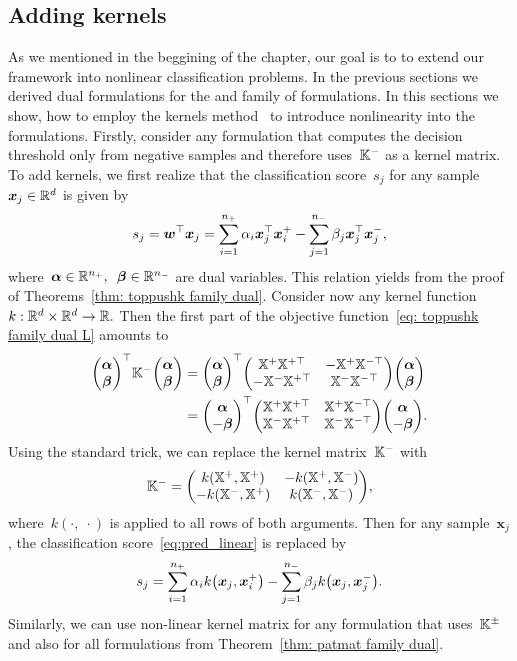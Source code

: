 \subsection{Adding kernels}

As we mentioned in the beggining of the chapter, our goal is to to extend our framework into nonlinear classification problems. In the previous sections we derived dual formulations for the \TopPushK and \PatMat family of formulations. In this sections we show, how to employ the kernels method~\cite{scholkopf2001learning} to introduce nonlinearity into the formulations. Firstly, consider any formulation that computes the decision threshold only from negative samples and therefore uses~$\mathbb{K}^{-}$ as a kernel matrix. To add kernels, we first realize that the classification score~$s_j$ for any sample~$\bm{x}_j \in \mathbb{R}^d$ is given by 
\begin{equation}\label{eq:pred_linear}
  s_j
    = \bm{w}^{\top} \bm{x}_j
    = \sum_{i = 1}^{n_{+}} \alpha_i \bm{x}_j^{\top} \bm{x}_i^+ - \sum_{j = 1}^{n_{-}} \beta_j \bm{x}_j^{\top} \bm{x}_j^-,
\end{equation}
where~$\bm{\alpha} \in \mathbb{R}^{n_{+}},$~$\bm{\beta} \in \mathbb{R}^{n_{-}}$ are dual variables. This relation yields from the proof of Theorems~\ref{thm: toppushk family dual}. Consider now any kernel function~$k: \mathbb{R}^d \times \mathbb{R}^d \to \mathbb{R}.$ Then the first part of the objective function~\eqref{eq: toppushk family dual L} amounts to
\begin{align*}
  \vecab^\top \Kneg \vecab
  & = \vecab^\top \Matrix{\X^+ \X^{+\top} & -\X^+ \X^{-\top} \\ -\X^- \X^{+\top} & \X^- \X^{-\top} } \vecab \\
  & = \Matrix{\bm{\alpha} \\ -\bm{\beta}}^\top \Matrix{\X^+ \X^{+\top} & \X^+ \X^{-\top} \\ \X^- \X^{+\top} & \X^- \X^{-\top} }\Matrix{\bm{\alpha} \\ -\bm{\beta}}.
\end{align*}
Using the standard trick, we can replace the kernel matrix~$\mathbb{K}^{-}$ with
\begin{equation}\label{eq:kernel_nonlinear}
  \Kneg = \Matrix{k(\X^+, \X^{+}) & -k(\X^+, \X^{-}) \\ -k(\X^-, \X^{+}) & k(\X^-, \X^{-}) },
\end{equation}
where~$k(\cdot,\; \cdot)$ is applied to all rows of both arguments. Then for any sample~$\bm{x}_j$, the classification score~\eqref{eq:pred_linear} is replaced by
\begin{equation*}
  s_j = \sum_{i = 1}^{\npos} \alpha_i k\Brac{\bm{x}_j, \bm{x}^+_i} - \sum_{j = 1}^{\nneg} \beta_j k\Brac{\bm{x}_j, \bm{x}^-_j}.
\end{equation*}
Similarly, we can use non-linear kernel matrix for any formulation that uses~$\mathbb{K}^{\pm}$ and also for all formulations from Theorem~\ref{thm: patmat family dual}.

